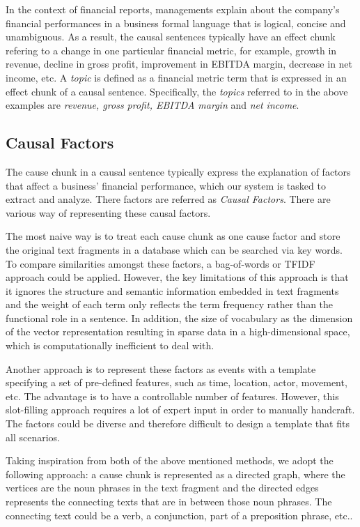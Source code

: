 In the context of financial reports, managements explain about the company's financial performances in a business formal language that is logical, concise and unambiguous. As a result, the causal sentences typically have an effect chunk refering to a change in one particular financial metric, for example, growth in revenue, decline in gross profit, improvement in EBITDA margin, decrease in net income, etc. A \emph{topic} is defined as a financial metric term that is expressed in an effect chunk of a causal sentence. Specifically, the \emph{topics} referred to in the above examples are \emph{revenue, gross profit, EBITDA margin} and \emph{net income}.


\subsection{Causal Factors}
The cause chunk in a causal sentence typically express the explanation of factors that affect a business' financial performance, which our system is tasked to extract and analyze. There factors are referred as \emph{Causal Factors}. There are various way of representing these causal factors. 

The most naive way is to treat each cause chunk as one cause factor and store the original text fragments in a database which can be searched via key words. To compare similarities amongst these factors, a bag-of-words or TFIDF approach could be applied. However, the key limitations of this approach is that it ignores the structure and semantic information embedded in text fragments and the weight of each term only reflects the term frequency rather than the functional role in a sentence. In addition, the size of vocabulary as the dimension of the vector representation resulting in sparse data in a high-dimensional space, which is computationally inefficient to deal with.  

Another approach is to represent these factors as events with a template specifying a set of pre-defined features, such as time, location, actor, movement, etc. The advantage is to have a controllable number of features. However, this slot-filling approach requires a lot of expert input in order to manually handcraft. The factors could be diverse and therefore difficult to design a template that fits all scenarios.   

Taking inspiration from both of the above mentioned methods, we adopt the following approach: a cause chunk is represented as a directed graph, where the vertices are the noun phrases in the text fragment and the directed edges represents the connecting texts that are in between those noun phrases. The connecting text could be a verb, a conjunction, part of a preposition phrase, etc.. 

